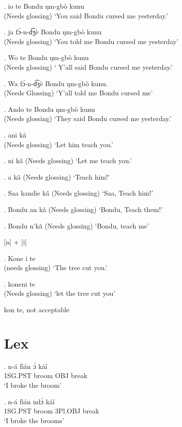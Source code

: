 \documentclass{assets/fieldnotes}
\begin{document}
{\exg. io te Bondu ŋm-gbò kunu\\
(Needs glossing)
`You said Bondu cursed me yesterday.'

\exg. ja fɔ̀-n-d͡ʒè Bondu ŋm-gbò kunu\\
(Needs glossing)
`You told me Bondu cursed me yesterday'

\exg. Wo te Bondu ŋm-gbò kunu \\
(Needs glossing)
` Y'all said Bondu cursed me yesterday.'

\exg. Wa fɔ̀-n-d͡ʒè Bondu ŋm-gbò kunu.\\
(Needs Glossing)
`Y'all told me Bondu cursed me'

\exg. Ando te Bondu ŋm-gbò kunu\\
(Needs glossing)
`They said Bondu cursed me yesterday.'



\exg. ani kã\\
(Needs glossing)
`Let him teach you.'

\exg. ni kã
(Needs glossing)
`Let me teach you.'

\exg. a kã
(Needs glossing)
`Teach him!'

\exg. Saa kandie kã
(Needs glossing)
`Saa, Teach him!'

\exg. Bondu an kã
(Needs glossing)
`Bondu, Teach them!'

\ex. Bondu n'kã
(Needs glossing)
`Bondu, teach me'


[n] + [i]

\exg. Kone i te\\
(needs glossing)
`The tree cut you.'

\exg. koneni te\\
(Needs glossing)
`let the tree cut you'

\item *kon te, not acceptable



\section{Lex}


\exg. n-á fìán ɔ̀ káí\\
1SG.PST broom    OBJ break\\
`I broke the broom'

\exg. n-á fìán ndɔ̀ káí\\
1SG.PST broom   3Pl.OBJ break\\
`I broke the brooms'

}
\end{document}
